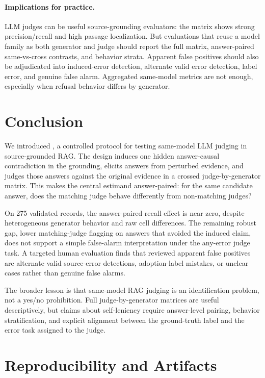 \paragraph{Implications for practice.}
LLM judges can be useful source-grounding evaluators: the matrix shows strong precision/recall and high passage localization. But evaluations that reuse a model family as both generator and judge should report the full matrix, answer-paired same-vs-cross contrasts, and behavior strata. Apparent false positives should also be adjudicated into induced-error detection, alternate valid error detection, label error, and genuine false alarm. Aggregated same-model metrics are not enough, especially when refusal behavior differs by generator.

\section{Conclusion}

We introduced \method, a controlled protocol for testing same-model LLM judging in source-grounded RAG. The design induces one hidden answer-causal contradiction in the grounding, elicits answers from perturbed evidence, and judges those answers against the original evidence in a crossed judge-by-generator matrix. This makes the central estimand answer-paired: for the same candidate answer, does the matching judge behave differently from non-matching judges?

On 275 validated records, the answer-paired recall effect is near zero, despite heterogeneous generator behavior and raw cell differences. The remaining robust gap, lower matching-judge flagging on answers that avoided the induced claim, does not support a simple false-alarm interpretation under the any-error judge task. A targeted human evaluation finds that reviewed apparent false positives are alternate valid source-error detections, adoption-label mistakes, or unclear cases rather than genuine false alarms.

The broader lesson is that same-model RAG judging is an identification problem, not a yes/no prohibition. Full judge-by-generator matrices are useful descriptively, but claims about self-leniency require answer-level pairing, behavior stratification, and explicit alignment between the ground-truth label and the error task assigned to the judge.

\section*{Reproducibility and Artifacts}

